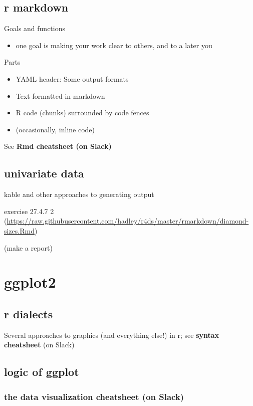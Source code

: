 \documentclass[]{book}
\providecommand{\tightlist}{%
  \setlength{\itemsep}{0pt}\setlength{\parskip}{0pt}}
\theoremstyle{definition}
\theoremstyle{definition}
\theoremstyle{definition}
\theoremstyle{remark}
\begin{document}
\section{r markdown}\label{r-markdown}

Goals and functions

\begin{itemize}
\tightlist
\item
  one goal is making your work clear to others, and to a later you
\end{itemize}

Parts

\begin{itemize}
\tightlist
\item
  YAML header: Some output formats
\item
  Text formatted in markdown
\item
  R code (chunks) surrounded by code fences
\item
  (occasionally, inline code)
\end{itemize}

See \textbf{Rmd cheatsheet (on Slack)}

\section{univariate data}\label{univariate-data}

kable and other approaches to generating output

exercise 27.4.7 2
(\url{https://raw.githubusercontent.com/hadley/r4ds/master/rmarkdown/diamond-sizes.Rmd})

(make a report)

\chapter{ggplot2}\label{ggplot2}

\section{r dialects}\label{r-dialects}

Several approaches to graphics (and everything else!) in r; see
\textbf{syntax cheatsheet} (on Slack)

\section{logic of ggplot}\label{logic-of-ggplot}

\subsection{\texorpdfstring{the \textbf{data visualization cheatsheet}
(on
Slack)}{the data visualization cheatsheet (on Slack)}}\label{the-data-visualization-cheatsheet-on-slack}
\end{document}
